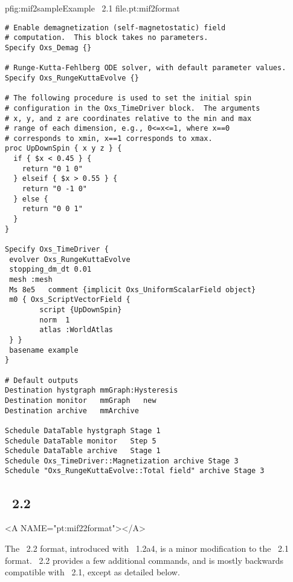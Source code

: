 \begin{codelisting}{p}{fig:mif2sample}{Example \MIF~2.1 file.}{pt:mif2format}
\begin{verbatim}
# Enable demagnetization (self-magnetostatic) field
# computation.  This block takes no parameters.
Specify Oxs_Demag {}

# Runge-Kutta-Fehlberg ODE solver, with default parameter values.
Specify Oxs_RungeKuttaEvolve {}

# The following procedure is used to set the initial spin
# configuration in the Oxs_TimeDriver block.  The arguments
# x, y, and z are coordinates relative to the min and max
# range of each dimension, e.g., 0<=x<=1, where x==0
# corresponds to xmin, x==1 corresponds to xmax.
proc UpDownSpin { x y z } {
  if { $x < 0.45 } {
    return "0 1 0"
  } elseif { $x > 0.55 } {
    return "0 -1 0"
  } else {
    return "0 0 1"
  }
}

Specify Oxs_TimeDriver {
 evolver Oxs_RungeKuttaEvolve
 stopping_dm_dt 0.01
 mesh :mesh
 Ms 8e5   comment {implicit Oxs_UniformScalarField object}
 m0 { Oxs_ScriptVectorField {
        script {UpDownSpin}
        norm  1
        atlas :WorldAtlas
 } }
 basename example
}

# Default outputs
Destination hystgraph mmGraph:Hysteresis
Destination monitor   mmGraph   new
Destination archive   mmArchive

Schedule DataTable hystgraph Stage 1
Schedule DataTable monitor   Step 5
Schedule DataTable archive   Stage 1
Schedule Oxs_TimeDriver::Magnetization archive Stage 3
Schedule "Oxs_RungeKuttaEvolve::Total field" archive Stage 3
\end{verbatim}
\end{codelisting}


\subsection{\MIF\ 2.2}\label{sec:mif22format}
\begin{rawhtml}
<A NAME="pt:mif22format"></A>
\end{rawhtml}
The \MIF~2.2 format, introduced with \OOMMF~1.2a4, is a minor
modification to the \MIF~2.1 format.  \MIF~2.2 provides a few additional
commands, and is mostly backwards compatible with \MIF~2.1, except as
detailed below.
